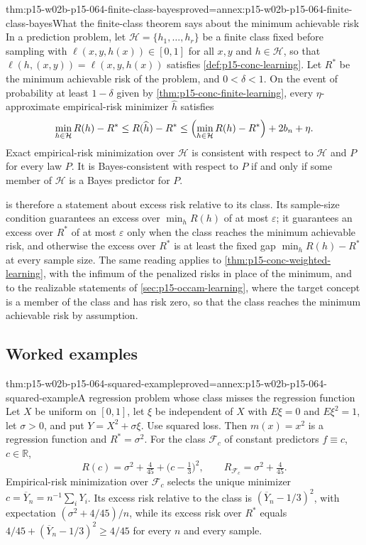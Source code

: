\begin{hbcorollary}{thm:p15-w02b-p15-064-finite-class-bayes}{proved=annex:p15-w02b-p15-064-finite-class-bayes}{What the finite-class theorem says about the minimum achievable risk}
In a prediction problem, let \(\mathcal H=\{h_1,\ldots,h_r\}\) be a finite
class fixed before sampling with \(\ell(x,y,h(x))\in[0,1]\) for all
\(x,y\) and \(h\in\mathcal H\), so that \(\ell(h,(x,y))=\ell(x,y,h(x))\)
satisfies \cref{def:p15-conc-learning}. Let \(R^{*}\) be the minimum
achievable risk of the problem, and \(0<\delta<1\). On the event of
probability at least \(1-\delta\) given by
\cref{thm:p15-conc-finite-learning}, every \(\eta\)-approximate
empirical-risk minimizer \(\widehat h\) satisfies
\[
 \min_{h\in\mathcal H}R(h)-R^{*}
 \leq R(\widehat h)-R^{*}
 \leq\Bigl(\min_{h\in\mathcal H}R(h)-R^{*}\Bigr)+2b_n+\eta .
\]
Exact empirical-risk minimization over \(\mathcal H\) is consistent with
respect to \(\mathcal H\) and \(P\) for every law \(P\). It is
Bayes-consistent with respect to \(P\) if and only if some member of
\(\mathcal H\) is a Bayes predictor for \(P\).
\end{hbcorollary}

 is therefore a statement about excess
risk relative to its class. Its sample-size condition guarantees an excess
over \(\min_hR(h)\) of at most \(\varepsilon\); it guarantees an excess over
\(R^{*}\) of at most \(\varepsilon\) only when the class reaches the minimum
achievable risk, and otherwise the excess over \(R^{*}\) is at least the
fixed gap \(\min_hR(h)-R^{*}\) at every sample size. The same reading applies
to \cref{thm:p15-conc-weighted-learning}, with the infimum of the penalized
risks in place of the minimum, and to the realizable statements of
\cref{sec:p15-occam-learning}, where the target concept is a member of the
class and has risk zero, so that the class reaches the minimum achievable
risk by assumption.

\subsection{Worked examples}

\begin{hbtheorem}{thm:p15-w02b-p15-064-squared-example}{proved=annex:p15-w02b-p15-064-squared-example}{A regression problem whose class misses the regression function}
Let \(X\) be uniform on \([0,1]\), let \(\xi\) be independent of \(X\) with
\(E\xi=0\) and \(E\xi^2=1\), let \(\sigma>0\), and put
\(Y=X^2+\sigma\xi\). Use squared loss. Then \(m(x)=x^2\) is a regression
function and \(R^{*}=\sigma^2\). For the class \(\mathcal F_c\) of constant
predictors \(f\equiv c\), \(c\in\mathbb R\),
\[
 R(c)=\sigma^2+\tfrac4{45}+\bigl(c-\tfrac13\bigr)^2,\qquad
 R_{\mathcal F_c}=\sigma^2+\tfrac4{45}.
\]
Empirical-risk minimization over \(\mathcal F_c\) selects the unique
minimizer \(c=\overline Y_n=n^{-1}\sum_iY_i\). Its excess risk relative to
the class is \((\overline Y_n-1/3)^2\), with expectation
\((\sigma^2+4/45)/n\), while its excess risk over \(R^{*}\) equals
\(4/45+(\overline Y_n-1/3)^2\geq4/45\) for every \(n\) and every sample.
\end{hbtheorem}

